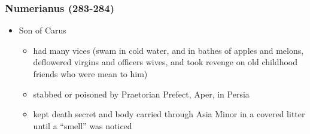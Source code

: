 \documentclass[12pt, twoside]{article}
\begin{document}
\subsubsection{Numerianus (283-284)}
\begin{itemize}
\item Son of Carus
	\begin{itemize}
	\item had many vices (swam in cold water, and in bathes of apples and melons, deflowered virgins and officers wives, and took revenge on old childhood friends who were mean to him) 
	\item stabbed or poisoned by Praetorian Prefect, Aper,  in Persia
	\item kept death secret and body carried through Asia Minor in a covered litter until a “smell” was noticed
	\end{itemize}
\end{itemize}
\end{document}
